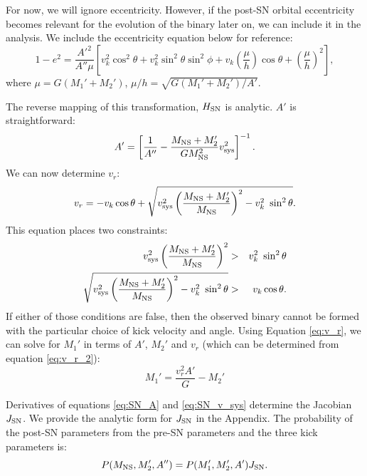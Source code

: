 \documentclass[12pt, preprint]{aastex}
\begin{document}
For now, we will ignore eccentricity. However, if the post-SN orbital eccentricity becomes relevant for the evolution of the binary later on, we can include it in the analysis. We include the eccentricity equation below for reference:
\begin{equation}
1-e^2 = \frac{A'^2}{A'' \mu} \left[ v_k^2 \cos^2\theta + v_k^2 \sin^2 \theta \sin^2 \phi + v_k \left( \frac{\mu}{h} \right) \cos \theta + \left( \frac{\mu}{h} \right)^2  \right], \label{eq:SN_e}
\end{equation}
where $\mu = G(M_1' + M_2')$, $\mu/h = \sqrt{G(M_1'+M_2') / A'}$.

The reverse mapping of this transformation, $H_{\rm SN}$ is analytic. $A'$ is straightforward:
\begin{equation}
A' = \left[ \frac{1}{A''} - \frac{M_{\rm NS} + M_2'}{G M_{\rm NS}^2} v_{\rm sys}^2 \right]^{-1}.
\end{equation}
We can now determine $v_r$:
\begin{equation}
v_r = -v_k \cos \theta + \sqrt{v_{\rm sys}^2 \left( \frac{M_{\rm NS} + M_2'}{M_{\rm NS}} \right)^2 - v_k^2\ \sin^2 \theta}. \label{eq:v_r_2}
\end{equation}
This equation places two constraints:
\begin{eqnarray}
v_{\rm sys}^2 \left( \frac{M_{\rm NS} + M_2'}{M_{\rm NS}} \right)^2 &>& v_k^2\ \sin^2 \theta \\ 
\sqrt{v_{\rm sys}^2 \left( \frac{M_{\rm NS} + M_2'}{M_{\rm NS}} \right)^2 - v_k^2\ \sin^2 \theta} &>& v_k \cos \theta.
\end{eqnarray}
If either of those conditions are false, then the observed binary cannot be formed with the particular choice of kick velocity and angle. Using Equation \ref{eq:v_r}, we can solve for $M_1'$ in terms of $A'$, $M_2'$ and $v_r$ (which can be determined from equation \ref{eq:v_r_2}):
\begin{equation}
M_1' = \frac{v_r^2 A'}{G} - M_2'
\end{equation}


Derivatives of equations \ref{eq:SN_A} and \ref{eq:SN_v_sys} determine the Jacobian $J_{\rm SN}$. We provide the analytic form for $J_{\rm SN}$ in the Appendix. The probability of the post-SN parameters from the pre-SN parameters and the three kick parameters is:
\begin{equation}
P(M_{\rm NS}, M_2', A'') = P(M_1', M_2', A') J_{\rm SN}. \label{eq:P_SN}
\end{equation}
\end{document}

